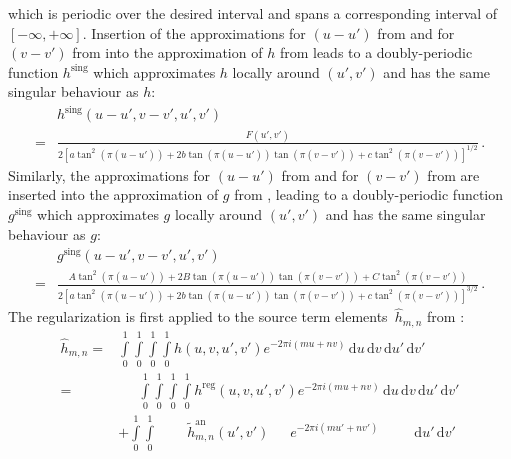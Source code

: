 which is periodic over the desired interval and spans a corresponding interval of $[-\infty, +\infty]$.
Insertion of the approximations for $(u-u')$ from  and for $(v-v')$ from  into
the approximation of $h$ from  leads to a doubly-periodic function $h^\mathrm{sing}$ which approximates $h$
locally around $(u',v')$ and has the same singular behaviour as $h$:
\begin{align}
  ~& h^\mathrm{sing} (u-u',v-v',u',v') \nonumber \\
  =& \frac{F(u',v')}
          {2 \left[ a \tan^2\left(\pi (u-u')\right) + 2 b \tan\left(\pi (u-u') \right) \tan\left(\pi (v-v') \right) + c \tan^2\left(\pi (v-v') \right) \right]^{1/2}} \, . \label{eqn:h_sing}
\end{align}
Similarly, the approximations for $(u-u')$ from  and for $(v-v')$ from 
are inserted into the approximation of $g$ from , leading to a doubly-periodic function $g^\mathrm{sing}$ which approximates $g$
locally around $(u',v')$ and has the same singular behaviour as $g$:
\begin{align}
  ~& g^\mathrm{sing} (u-u',v-v',u',v') \nonumber \\
  =& \frac{A \tan^2\left(\pi (u-u')\right) + 2 B \tan\left(\pi (u-u') \right) \tan\left(\pi (v-v') \right) + C \tan^2\left(\pi (v-v') \right)}
          {2 \left[ a \tan^2\left(\pi (u-u')\right) + 2 b \tan\left(\pi (u-u') \right) \tan\left(\pi (v-v') \right) + c \tan^2\left(\pi (v-v') \right) \right]^{3/2}} \, . \label{eqn:g_sing}
\end{align}
The regularization is first applied to the source term elements~$\hat{h}_{m,n}$ from :
\begin{align}
  \hat{h}_{m,n}
  =& \int\limits_0^1 \int\limits_0^1 \int\limits_0^1 \int\limits_0^1
      h(u,v,u',v') e^{-2 \pi i (m u + n v)}
      \,\mathrm{d}u \,\mathrm{d}v \,\mathrm{d}u' \,\mathrm{d}v' \nonumber \\
  =& \phantom{+}~\int\limits_0^1 \int\limits_0^1 \int\limits_0^1 \int\limits_0^1
                   h^\mathrm{reg} (u,v,u',v') e^{-2 \pi i (m u + n v)}
                 \,\mathrm{d}u \,\mathrm{d}v \,\mathrm{d}u' \,\mathrm{d}v'  \\
  ~&          +  \int\limits_0^1 \int\limits_0^1 \phantom{\int\limits_0^1 \int\limits_0^1}
                   \,\tilde{h}^\mathrm{an}_{m,n} (u',v') \phantom{u,v} e^{-2 \pi i (m u' + n v')}
                 \phantom{\mathrm{d}u \,\mathrm{d}v} \,\mathrm{d}u' \,\mathrm{d}v'
\end{align}
